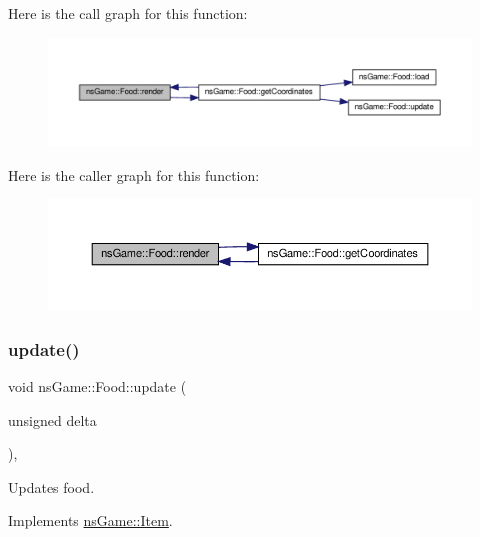 Here is the call graph for this function\+:
\nopagebreak
\begin{figure}[H]
\begin{center}
\leavevmode
\includegraphics[width=350pt]{classns_game_1_1_food_a503e4b78c3a07ec6dbc9cfe2c79742e0_cgraph}
\end{center}
\end{figure}
Here is the caller graph for this function\+:
\nopagebreak
\begin{figure}[H]
\begin{center}
\leavevmode
\includegraphics[width=350pt]{classns_game_1_1_food_a503e4b78c3a07ec6dbc9cfe2c79742e0_icgraph}
\end{center}
\end{figure}
\mbox{\label{classns_game_1_1_food_a84b519ecca0f27b862878170e08c8731}} 
\subsubsection{\texorpdfstring{update()}{update()}}
{\footnotesize\ttfamily void ns\+Game\+::\+Food\+::update (\begin{DoxyParamCaption}\item[{unsigned}]{delta }\end{DoxyParamCaption})\hspace{0.3cm}{\ttfamily [override]}, {\ttfamily [virtual]}}



Updates food. 



Implements \hyperlink{structns_game_1_1_item_a96c07d0f91eef0d77e91d1a7397091a1}{ns\+Game\+::\+Item}.



